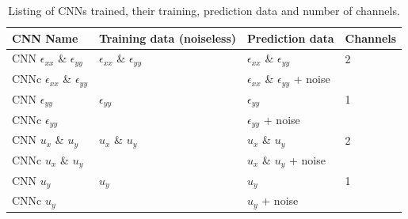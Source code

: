 \documentclass[12pt]{article}
\begin{document}
%
\begin{center}
\begin{table}
  \centering
  \begin{tabular}{|p{3cm}|p{2cm}|p{3cm}|p{1.5cm}|}
    \hline
    CNN Name & Training data (noiseless) & Prediction data & Channels\\
    \hline
    CNN $\epsilon_{xx}$ \& $\epsilon_{yy}$ &  $\epsilon_{xx}$ \& $\epsilon_{yy}$ & $\epsilon_{xx}$ \& $\epsilon_{yy}$ & 2\\
    CNNc $\epsilon_{xx}$ \& $\epsilon_{yy}$ &  & $\epsilon_{xx}$ \& $\epsilon_{yy}$ + noise & \\
    \hline
    CNN $\epsilon_{yy}$ & $\epsilon_{yy}$ & $\epsilon_{yy}$ & 1\\
    CNNc $\epsilon_{yy}$ &  & $\epsilon_{yy}$ + noise & \\
    \hline
    CNN $u_x$ \& $u_y$ & $u_x$ \& $u_y$ & $u_x$ \& $u_y$ & 2\\
    CNNc $u_x$ \& $u_y$&  & $u_x$ \& $u_y$ + noise & \\    
    \hline
    CNN $u_y$  & $u_y$ & $u_y$ & 1\\
    CNNc $u_y$ &  & $u_y$ + noise & \\
    \hline
  \end{tabular}
  \caption{\label{tab:cnnone:io} Listing of CNNs trained, their training, prediction data and number of channels.}
\end{table}
\end{center}
%
\end{document}
